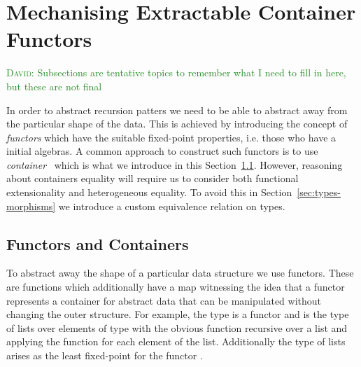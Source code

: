 \documentclass[anonymous, a4paper, UKenglish, cleveref, autoref, thm-restate]{lipics-v2021}
\newcommand{\dcas}[1]{\textcolor{ForestGreen}{\textsc{David}: #1}}
\newcommand{\R}{\mathbb{R}}
\newcommand{\operator}[1]{\textsf{#1}}
\begin{document}

\section{Mechanising Extractable Container Functors}
\dcas{Subsections are tentative topics to remember what I need to fill in here,
but these are not final}

In order to abstract recursion patters we need to be able to abstract away from
the particular shape of the data.  This is achieved by introducing the concept
of \emph{functors} which have the suitable fixed-point properties, i.e. those
who have a initial algebras. A common approach to construct such functors is to
use \emph{container}~\cite{AbbottAG05} which is what we introduce in this
Section~\ref{sec:containers}.  However, reasoning about containers equality will
require us to consider both functional extensionality and heterogeneous
equality. To avoid this in Section~\ref{sec:types-morphisms} we introduce a
custom equivalence relation on types.

\subsection{Functors and Containers}
\label{sec:containers}
To abstract away the shape of a particular data structure we use functors.
These are functions  which additionally have a
map  witnessing the idea that a
functor represents a container for abstract data that can be manipulated without
changing the outer structure. For example, the type  is
a functor and  is the type of lists over elements of type 
with the obvious  function recursive over a list and applying the
function  for each element of the list.
Additionally the type of lists arises as the least fixed-point for the
functor .
\end{document}
